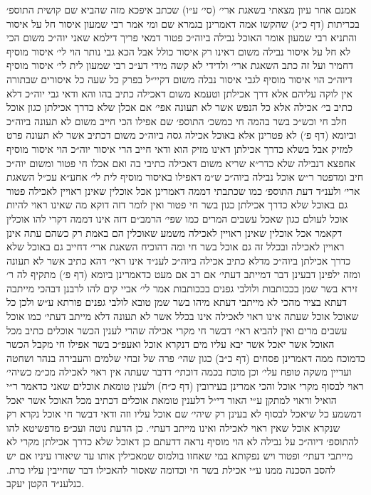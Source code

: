 \documentclass[12pt, openany]{book}
\begin{document}
\begin{multicols}{2}
אמנם אחר עיון מצאתי בשאגת ארי׳ (סי׳ ע״ו) שכתב איפכא מזה שהביא שם קושית התוספ׳ בכריתות (דף כ״ג) שהקשו אמה דאמרינן בגמרא שם ומי אמר רבי שמעון איסור חל על איסור והתניא רבי שמעון אומר האוכל נבילה ביוה״כ פטור דמאי פריך דילמא שאני יוה״כ משום הכי לא חל על איסור נבילה משום דאינו רק איסור כולל אבל הכא גבי נותר הוי לי׳ איסור מוסיף דחמיר ועל זה כתב השאגת ארי׳ ולדידי לא קשה מידי דע״כ רבי שמעון לית לי׳ איסור מוסיף דיוה״כ הוי איסור מוסיף לגבי איסור נבלה משום דקיי״ל בפרק כל שעה כל איסורים שבתורה אין לוקה עליהם אלא דרך אכילתן וטעמא משום דאכילה כתיב בהו והא ודאי גבי יוה״כ דלא כתיב בי׳ אכילה אלא כל הנפש אשר לא תעונה אפי׳ אם אכלן שלא כדרך אכילתן כגון אוכל חלב חי וכש״כ בשר בהמה חי כמשכ׳ התוספ׳ שם אפילו הכי חייב משום לא תעונה ביוה״כ וביומא (דף פ׳) לא פטרינן אלא באוכל אכילה גסה ביוה״כ משום דכתיב אשר לא תעונה פרט למזיק אבל בשלא כדרך אכילתן דאינו מזיק הוא ודאי חייב הרי איסור יוה״כ הוי איסור מוסיף אחפצא דנבילה שלא כדר״א שריא משום דאכילה כתיבי בה ואם אכלו חי פטור ומשום יוה״כ חיב ומדפטר ר״ש אוכל נבילה ביוה״כ ש״מ דאפילו באיסור מוסיף לית לי׳ אחע״א עכ״ל השאגת ארי׳ ולענ״ד דעת התוספ׳ כמו שכתבתי דממה דאמרינן אכל אוכלין שאינן ראויין לאכילה פטור גם באוכל שלא כדרך אכילתן כגון בשר חי פטור ואין לומר דזה דוקא מה שאינו ראוי להיות אוכל לעולם כגון שאכל עשבים המרים כמו שפי׳ הרמב״ם דזה אינו דממה דקרי להו אוכלין דקאמר אכל אוכלין שאינן ראויין לאכילה משמע שאוכלין הם באמת רק כשהם עתה אינן ראויין לאכילה ובכלל זה גם אוכל בשר חי ומה דהוכיח השאגת ארי׳ דחייב גם באוכל שלא כדרך אכילתן ביוה״כ מדלא כתיב אכילה ביוה״כ לענ״ד אינו ראי׳ דהא כתיב אשר לא תעונה ומזה ילפינן דבעינן דבר דמייתב דעתי׳ אם רב אם מעט כדאמרינן ביומא (דף פ׳) מתקיף לה ר׳ זירא בשר שמן בככותבות ולולבי גפנים בככותבות אמר לי׳ אביי קים להו לרבנן דבהכי מייתבה דעתא בציר מהכי לא מייתבי דעתא מיהו בשר שמן טובא לולבי גפנים פורתא ע״ש ולכן כל שאוכל אוכל שעתה אינו ראוי לאכילה אינו בכלל אשר לא תעונה דלא מייתב דעתי׳ כמו אוכל עשבים מרים ואין להביא ראי׳ דבשר חי מקרי אכילה שהרי לענין הכשר אוכלים כתיב מכל האוכל אשר יאכל אשר יבא עליו מים דנקרא אוכל ואעפ״כ בשר אפילו חי מקבל הכשר כדמוכח ממה דאמרינן פסחים (דף כ״ב) כגון שהי׳ פרה של זבחי שלמים והעבירה בנהר ושחטה ועדיין משקה טופח עלי׳ וכן מוכח בכמה דוכתי׳ דדבר שעתה אין ראוי לאכילה מכ״מ כשיהי׳ ראוי לבסוף מקרי אוכל והכי אמרינן בעירובין (דף כ״ח) ולענין טומאת אוכלים שאני כדאמר ר״י הואיל וראוי למתקן ע״י האור די״ל דלענין טומאת אוכלים דכתיב מכל האוכל אשר יאכל דמשמע כל שיאכל לבסוף לא בעינן רק שיהי׳ שם אוכל עליו וזה ודאי דבשר חי אוכל נקרא רק שנקרא אוכל שאין ראוי לאכילה ואינו מייתב דעתי׳. כן הדעת נוטה ועכ״פ מדפשיטא להו להתוספ׳ דיוה״כ על נבילה לא הוי מוסיף נראה דדעתם כן דאוכל שלא כדרך אכילתן מקרי לא מייתבי דעתי׳ ופטור ויש נפקותא במי שאחזו בולמוס שמאכילין אותו עד שיאורו עיניו אם יש להסב הסכנה ממנו ע״י אכילת בשר חי וכדומה שאסור להאכילו דבר שחייבין עליו כרת. כנלענ״ד הקטן יעקב.\\\vspace{0pt}

\end{multicols}\newpage
\end{document}
